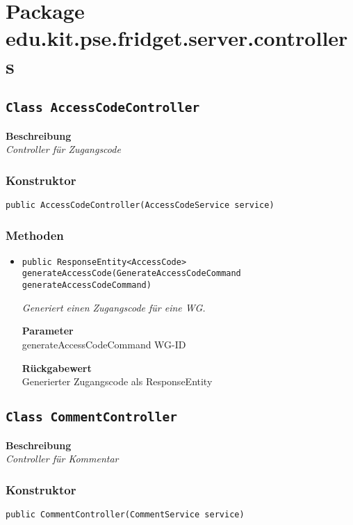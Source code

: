 

%
    \section{Package edu.kit.pse.fridget.server.controllers}
    \subsection{\texttt{Class AccessCodeController}}
    \textbf{Beschreibung} \\
    \textit{Controller für Zugangscode}
    \subsubsection*{Konstruktor}
    \texttt{public AccessCodeController(AccessCodeService service)}
    \subsubsection*{Methoden}
    \begin{itemize}
    	\item{\texttt{public ResponseEntity<AccessCode> generateAccessCode(GenerateAccessCodeCommand generateAccessCodeCommand)}}
    	
    	\textit{Generiert einen Zugangscode für eine WG.}
    	
    	\textbf{Parameter} \\
    	generateAccessCodeCommand WG-ID
    	
    	\textbf{Rückgabewert} \\
    	Generierter Zugangscode als ResponseEntity
    \end{itemize}
    \subsection{\texttt{Class CommentController}}
    \textbf{Beschreibung} \\
    \textit{Controller für Kommentar}
    \subsubsection*{Konstruktor}
    \texttt{public CommentController(CommentService service)}
